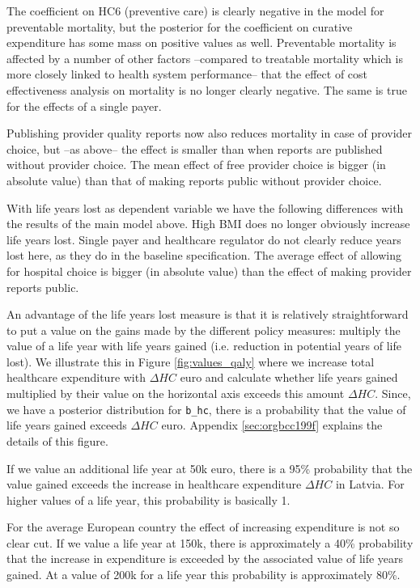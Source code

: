 \documentclass[a4paper,12pt]{article}
\begin{document}
The coefficient on HC6 (preventive care) is clearly negative in the model for preventable mortality, but the posterior for the coefficient on curative expenditure has some mass on positive values as well. Preventable mortality is affected by a number of other factors --compared to treatable mortality which is more closely linked to health system performance-- that the effect of cost effectiveness analysis on mortality is no longer clearly negative. The same is true for the effects of a single payer.

Publishing provider quality reports now also reduces mortality in case of provider choice, but --as above-- the effect is smaller than when reports are published without provider choice. The mean effect of free provider choice is bigger (in absolute value) than that of making reports public without provider choice.

With life years lost as dependent variable we have the following differences with the results of the main model above. High BMI does no longer obviously increase life years lost. Single payer and healthcare regulator do not clearly reduce years lost here, as they do in the baseline specification. The average effect of allowing for hospital choice is bigger (in absolute value) than the effect of making provider reports public.

An advantage of the life years lost measure is that it is relatively straightforward to put a value on the gains made by the different policy measures: multiply the value of a life year with life years gained (i.e. reduction in potential years of life lost). We illustrate this in Figure \ref{fig:values_qaly} where we increase total healthcare expenditure with \(\Delta HC\) euro and calculate whether life years gained multiplied by their value on the horizontal axis exceeds this amount \(\Delta HC\). Since, we have a posterior distribution for \texttt{b\_hc}, there is a probability that the value of life years gained exceeds \(\Delta HC\) euro. Appendix \ref{sec:orgbcc199f} explains the details of this figure.

If we value an additional life year at 50k euro, there is a 95\% probability that the value gained exceeds the increase in healthcare expenditure \(\Delta HC\) in Latvia. For higher values of a life year, this probability is basically 1.

For the average European country the effect of increasing expenditure is not so clear cut. If we value a life year at 150k, there is approximately a 40\% probability that the increase in expenditure is exceeded by the associated value of life years gained. At a value of 200k for a life year this probability is approximately 80\%.
\end{document}
